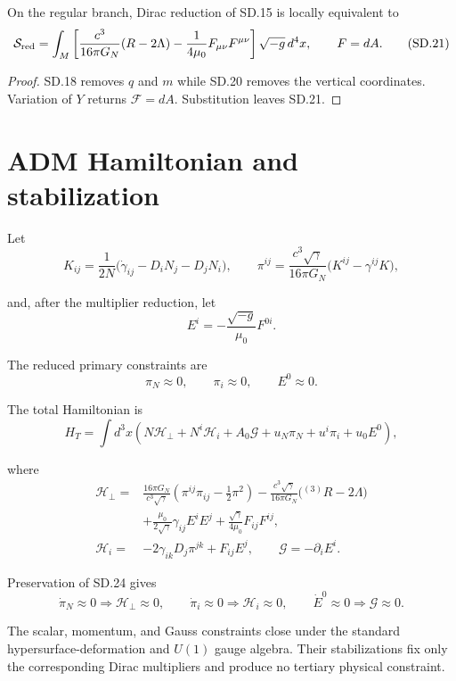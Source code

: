 \documentclass[10pt]{article}
\begin{document}
\begin{theorem}
On the regular branch, Dirac reduction of SD.15 is locally equivalent to
\[
\mathcal S_{\rm red}=\int_M\left[
\frac{c^3}{16\pi G_N}(R-2\Lambda)
-\frac1{4\mu_0}F_{\mu\nu}F^{\mu\nu}
\right]\sqrt{-g}\,d^4x,
\qquad F=dA.
\tag{SD.21}
\]
\par\noindent
\end{theorem}

\begin{proof}
SD.18 removes $q$ and $m$ while SD.20 removes the vertical coordinates.
Variation of $Y$ returns $\mathcal F=dA$. Substitution leaves SD.21.
\end{proof}

\section{ADM Hamiltonian and stabilization}

Let
\[
K_{ij}=\frac1{2N}\bigl(\dot\gamma_{ij}-D_iN_j-D_jN_i\bigr),
\qquad
\pi^{ij}=\frac{c^3\sqrt\gamma}{16\pi G_N}
\bigl(K^{ij}-\gamma^{ij}K\bigr),
\tag{SD.22}
\]
\par\noindent
and, after the multiplier reduction, let
\[
E^i=-\frac{\sqrt{-g}}{\mu_0}F^{0i}.
\tag{SD.23}
\]
\par\noindent
The reduced primary constraints are
\[
\pi_N\approx0,\qquad \pi_i\approx0,\qquad E^0\approx0.
\tag{SD.24}
\]
\par\noindent
The total Hamiltonian is
\[
H_T=\int d^3x\left(
N\mathcal H_\perp+N^i\mathcal H_i+A_0\mathcal G
+u_N\pi_N+u^i\pi_i+u_0E^0\right),
\tag{SD.25}
\]
\par\noindent
where
\[
\begin{aligned}
\mathcal H_\perp={}&
\frac{16\pi G_N}{c^3\sqrt\gamma}
\left(\pi^{ij}\pi_{ij}-\frac12\pi^2\right)
-\frac{c^3\sqrt\gamma}{16\pi G_N}\bigl({}^{(3)}R-2\Lambda\bigr)\\
&+\frac{\mu_0}{2\sqrt\gamma}\gamma_{ij}E^iE^j
+\frac{\sqrt\gamma}{4\mu_0}F_{ij}F^{ij},\\
\mathcal H_i={}&-2\gamma_{ik}D_j\pi^{jk}+F_{ij}E^j,
\qquad
\mathcal G=-\partial_iE^i.
\end{aligned}
\tag{SD.26}
\]
\par\noindent
Preservation of SD.24 gives
\[
\dot\pi_N\approx0\Longrightarrow\mathcal H_\perp\approx0,
\qquad
\dot\pi_i\approx0\Longrightarrow\mathcal H_i\approx0,
\qquad
\dot E^0\approx0\Longrightarrow\mathcal G\approx0.
\tag{SD.27}
\]
\par\noindent
The scalar, momentum, and Gauss constraints close under the standard
hypersurface-deformation and $U(1)$ gauge algebra. Their stabilizations fix
only the corresponding Dirac multipliers and produce no tertiary physical
constraint.
\end{document}
